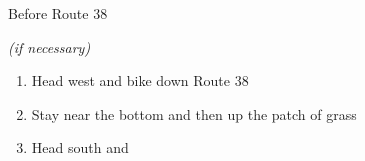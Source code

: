 \begin{paracol}{2}
\begin{menu}{Before Route 38}
	\varwb
	\begin{packMenu}
		\small{\item \superPotion{} \textit{(if necessary)}}
		\item \repel 
		\item \bike
	\end{packMenu}
	\varwe
\end{menu}

\begin{enumerate}[resume]
	\item Head west and bike down Route 38
	\item Stay near the bottom and then up the patch of grass 
	\item Head south and 
\end{enumerate}

\end{paracol}
\vspace{3.5mm}